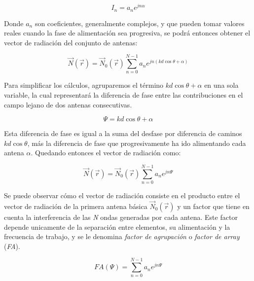 \begin{equation}
	I_{n}=a_{n}e^{jn\alpha} 
	\label{eq:fasor}
\end{equation}

\par Donde $a_{n}$ son coeficientes, generalmente complejos, y que pueden tomar valores reales cuando la fase de alimentación sea progresiva, se podrá entonces
obtener el vector de radiación del conjunto de antenas:

\begin{equation}
	\vec{N}\left ( \vec{r} \right )= \vec{N}_{0}\left ( \vec{r} \right )\sum_{n=0}^{N-1}a_{n}e^{jn(kd\cos\theta+\alpha)}
	\label{eq:vecrad}
\end{equation}

\par Para simplificar los cálculos, agruparemos el término $kd\cos\theta+\alpha$ en una sola variable, la cual representará la diferencia de fase entre las contribuciones en el campo lejano de dos antenas consecutivas. 

\begin{equation}
	\Psi = kd\cos\theta+\alpha
	\label{eq:psi}
\end{equation}

\par Esta diferencia de fase es igual a la suma del desfase por diferencia de caminos $kd\cos\theta$, más la diferencia de fase que progresivamente ha ido alimentando cada antena $\alpha$. Quedando entonces el vector de radiación como: 

\begin{equation}
	\vec{N}\left ( \vec{r} \right )= \vec{N}_{0}\left ( \vec{r} \right )\sum_{n=0}^{N-1}a_{n}e^{jn\Psi}
	\label{eq:vecrad2}
\end{equation}

\par Se puede observar cómo el vector de radiación consiste en el producto entre el vector de radiación de la primera antena básica $\vec{N}_{0}\left ( \vec{r} \right ) $ y un factor que tiene en cuenta la interferencia de las \textit{N} ondas generadas por cada antena. Este factor depende unicamente de la separación entre elementos, su alimentación y la frecuencia de trabajo, y se le denomina \textit{factor de agrupación} o \textit{factor de array} (\textit{FA}).

\begin{equation}
	FA(\Psi)=\sum_{n=0}^{N-1}a_{n}e^{jn\Psi}
	\label{eq:fa}
\end{equation}

